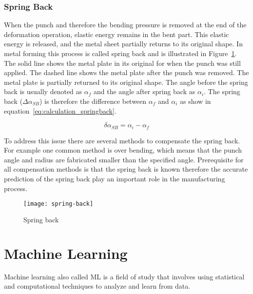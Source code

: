 \subsubsection{Spring Back}
When the punch and therefore the bending pressure is removed at the end of the deformation
operation, elastic energy remains in the bent part. This elastic energy is released,
and the
metal sheet partially returns to its original shape. \cite[p.
113-114]{groover_fundamentalsmodernmanufacturing_2020} In metal forming this process is
called
spring back and is illustrated in Figure~\ref{fig:spring-back}.
The solid line shows the metal plate in its original for when the punch was still
applied. The
dashed line shows the metal plate after the punch was removed. The metal plate is
partially
returned to its original shape. The angle before the spring back is usually denoted as $\alpha_f$
and the angle after spring back as $\alpha_i$.
The spring back ($\Delta \alpha_{SB}$) is therefore the difference between $\alpha_f$ and
$\alpha_i$ as show in equation~\ref*{eq:calculation_springback}. \cite[p.
6]{cruz_applicationmachinelearning_2021}

\begin{equation}
    \delta \alpha_{SB} = \alpha_i - \alpha_f
    \label{eq:calculation_springback}
\end{equation}

To address this issue there are several methods to compensate the spring back. For
example one
common method is over bending, which means that the punch angle and radius are
fabricated smaller
than the specified angle.
\cite[p. 114]{groover_fundamentalsmodernmanufacturing_2020}
Prerequisite for all compensation methods is that the spring back is known therefore
the accurate
prediction of the spring back play an important role in the manufacturing process.

\begin{figure}[H]
    \centering
    \texttt{[image: spring-back]}
    \caption{Spring back \cite[p. 5]{cruz_applicationmachinelearning_2021}}
    \label{fig:spring-back}
\end{figure}


\section{Machine Learning}\label{sec:machine-learning}
Machine learning also called \ac{ML} is a field of study that involves using
statistical and
computational techniques to analyze and learn from data. \cite[p.
1]{muller_introductionmachinelearning_2016}

